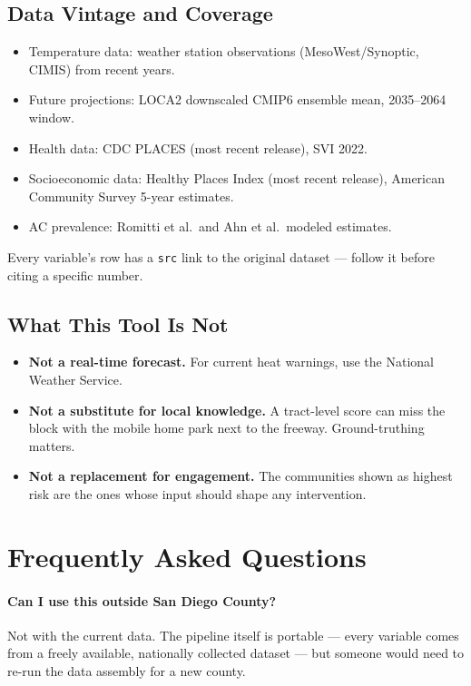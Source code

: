 \documentclass[11pt]{article}
\begin{document}
\subsection{Data Vintage and Coverage}

\begin{itemize}[leftmargin=*]
  \item Temperature data: weather station observations (MesoWest/Synoptic,
        CIMIS) from recent years.
  \item Future projections: LOCA2 downscaled CMIP6 ensemble mean,
        2035--2064 window.
  \item Health data: CDC PLACES (most recent release), SVI 2022.
  \item Socioeconomic data: Healthy Places Index (most recent release),
        American Community Survey 5-year estimates.
  \item AC prevalence: Romitti et al.\ and Ahn et al.\ modeled estimates.
\end{itemize}

Every variable's row has a \texttt{src} link to the original dataset ---
follow it before citing a specific number.

\subsection{What This Tool Is Not}

\begin{itemize}[leftmargin=*]
  \item \textbf{Not a real-time forecast.} For current heat warnings,
        use the National Weather Service.
  \item \textbf{Not a substitute for local knowledge.} A tract-level
        score can miss the block with the mobile home park next to the
        freeway. Ground-truthing matters.
  \item \textbf{Not a replacement for engagement.} The communities
        shown as highest risk are the ones whose input should shape
        any intervention.
\end{itemize}

\section{Frequently Asked Questions}

\paragraph{Can I use this outside San Diego County?}
Not with the current data. The pipeline itself is portable --- every
variable comes from a freely available, nationally collected dataset ---
but someone would need to re-run the data assembly for a new county.
\end{document}
